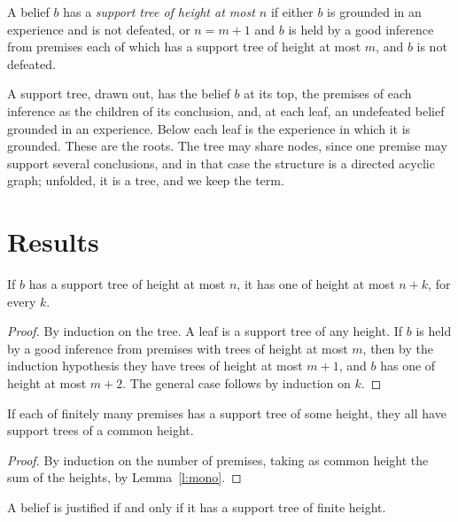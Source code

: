 \documentclass{situationist-preprint}
\begin{document}
\begin{definition}\label{d:tree}
A belief $b$ has a \emph{support tree of height at most $n$} if either $b$ is grounded in an experience and is not defeated, or $n = m+1$ and $b$ is held by a good inference from premises each of which has a support tree of height at most $m$, and $b$ is not defeated.
\end{definition}

A support tree, drawn out, has the belief $b$ at its top, the premises of each inference as the children of its conclusion, and, at each leaf, an undefeated belief grounded in an experience. Below each leaf is the experience in which it is grounded. These are the roots. The tree may share nodes, since one premise may support several conclusions, and in that case the structure is a directed acyclic graph; unfolded, it is a tree, and we keep the term.

\section{Results}\label{s:results}

\begin{lemma}[Monotonicity]\label{l:mono}
If $b$ has a support tree of height at most $n$, it has one of height at most $n+k$, for every $k$.
\end{lemma}

\begin{proof}
By induction on the tree. A leaf is a support tree of any height. If $b$ is held by a good inference from premises with trees of height at most $m$, then by the induction hypothesis they have trees of height at most $m+1$, and $b$ has one of height at most $m+2$. The general case follows by induction on $k$.
\end{proof}

\begin{lemma}\label{l:bound}
If each of finitely many premises has a support tree of some height, they all have support trees of a common height.
\end{lemma}

\begin{proof}
By induction on the number of premises, taking as common height the sum of the heights, by Lemma~\ref{l:mono}.
\end{proof}

\begin{theorem}\label{t:tree}
A belief is justified if and only if it has a support tree of finite height.
\end{theorem}
\end{document}
